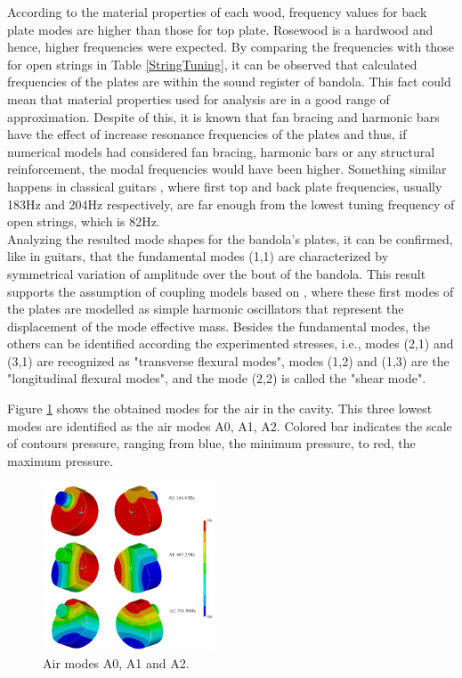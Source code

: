 According to the material properties of each wood, frequency values for back plate modes are higher than those for top plate. Rosewood is a hardwood and hence, higher frequencies were expected. By comparing the frequencies with those for open strings in Table \ref{StringTuning}, it can be observed that calculated frequencies of the plates are within the sound register of bandola. This fact could mean that material properties used for analysis are in a good range of approximation. Despite of this, it is known that fan bracing and harmonic bars have the effect of increase resonance frequencies of the plates and thus, if numerical models had considered fan bracing, harmonic bars or any structural reinforcement, the modal frequencies would have been higher. Something similar happens in classical guitars \cite{Rossing}, where first top and back plate frequencies, usually 183Hz and 204Hz respectively, are far enough from the lowest tuning frequency of open strings, which is 82Hz.\\

Analyzing the resulted mode shapes for the bandola's plates, it can be confirmed, like in guitars, that the fundamental modes (1,1) are characterized by symmetrical variation of amplitude over the bout of the bandola. This result supports the assumption of coupling models based on \cite{Christensen, Christensen3}, where these first modes of the plates are modelled as simple harmonic oscillators that represent the displacement of the mode effective mass. Besides the fundamental modes, the others can be identified according the experimented stresses, i.e., modes (2,1) and (3,1) are recognized as "transverse flexural modes", modes (1,2) and (1,3) are the "longitudinal flexural modes", and the mode (2,2) is called the "shear mode".

Figure \ref{AirModes13} shows the obtained modes for the air in the cavity. This three lowest modes are identified as the air modes A0, A1, A2. Colored bar indicates the scale of contours pressure, ranging from blue, the minimum pressure, to red, the maximum pressure.

\begin{figure}[h]
\centering
\includegraphics[height=5cm]{img/AirModes13.png}
\caption{Air modes A0, A1 and A2.}
\label{AirModes13}
\end{figure}

